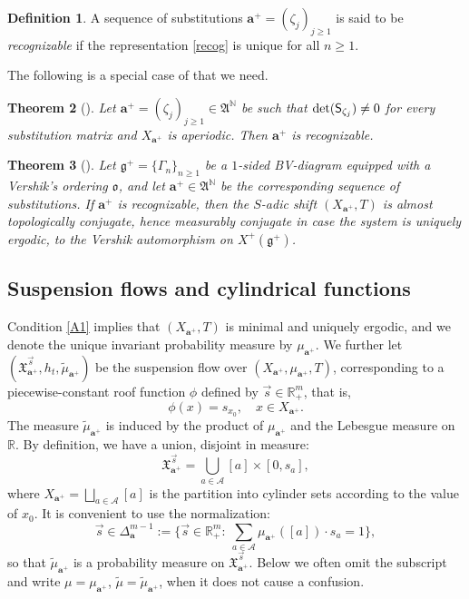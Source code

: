 \documentclass[10pt]{amsart}
\let\mathcal\mathscr
\theoremstyle{plain}
\newtheorem{theorem}{Theorem}[section]
\theoremstyle{definition}
\newtheorem{defi}[theorem]{Definition}
\let\wt\widetilde
\newcommand\bom{{\boldsymbol a}}\let\ba\bom
\let\Gam\Gamma
\newcommand\gf{\mathfrak{g}}
\newcommand\ok{\mathfrak{o}}
\newcommand\FrA{\mathfrak{A}}
\newcommand\Xx{\mathfrak{X}}
\newcommand\Ak{\mathcal{A}}
\newcommand{\R}{\mathbb{R}}
\newcommand{\N}{\mathbb{N}}
\newcommand\Sf{{\sf S}}
\begin{document}
\begin{defi} \label{def-recog}
A sequence of substitutions $\ba^+ = (\zeta_j)_{j\ge 1}$ is said to be \emph{recognizable} if the representation \eqref{recog} is unique for all $n\ge 1$.
\end{defi}

The following is a special case of \cite[Th.\,4.6]{BSTY} that we need.

\begin{theorem}[{\cite{BSTY}}] \label{th-recog0}
Let $\ba^+= (\zeta_j)_{j\ge 1} \in \FrA^\N$ be such that $\det(\Sf_{\zeta_j})\ne 0$ for every substitution matrix and $X_{\ba^+}$ is aperiodic. Then $\ba^+$ is recognizable.
\end{theorem}

\begin{theorem}[{\cite[Th.\,6.5]{BSTY}}] \label{thm-recog}
Let $\gf^+=\{\Gam_n\}_{n\ge 1}$ be a $1$-sided BV-diagram equipped with a Vershik's ordering $\ok$, and let $\ba^+\in \FrA^\N$ be the corresponding sequence of substitutions.
If $\ba^+$ is recognizable, then the $S$-adic shift $(X_{\ba^+},T)$ is almost topologically conjugate, hence measurably conjugate in case the system is uniquely ergodic, to the
Vershik automorphism on $X^+(\gf^+)$.
\end{theorem}

\subsection{Suspension flows and cylindrical functions}
Condition \eqref{A1} implies that $(X_{\ba^+},T)$ is minimal and uniquely ergodic, and we
denote the unique invariant probability measure by $\mu_{\bom^+}$.
We further let
$(\Xx_{\ba^+}^{\vec{s}}, h_t, \wt{\mu}_{\bom^+})$ be the suspension flow over $(X_{\ba^+},\mu_{\bom^+}, T)$, corresponding to a piecewise-constant roof function $\phi$ defined by \hbox{$\vec{s}\in \R^m_+$}, that is,
\[
\phi(x) = s_{x_0},\quad x\in X_{\ba^+}.
\]
The measure $\wt\mu_{\bom^+}$ is induced by the product of $\mu_{\bom^+}$ and the Lebesgue measure on $\R$.
By definition, we have a union, disjoint in measure:
\[
\Xx_{\ba^+}^{\vec{s}} = \bigcup_{a\in \Ak} [a]\times [0,s_a],
\]
where $X_{\ba^+} = \bigsqcup_{a\in \Ak} [a] $ is the partition into cylinder sets according to the value of $x_0$. It is convenient to use the normalization:
\[\textstyle
\vec{s} \in \Delta^{m-1}_\bom:= \bigl\{\vec s\in \R^m_+: \ \sum_{a\in \Ak} \mu_{\bom^+}([a]) \cdot s_a = 1\bigr\},
\]
so that $\wt \mu_{\bom^+}$ is a probability measure on $\Xx_{\ba^+}^{\vec{s}}$. Below we often omit the subscript and write $\mu = \mu_{\bom^+}$, $\wt\mu = \wt\mu_{\bom^+}$,
when it does not cause a confusion.
\end{document}

